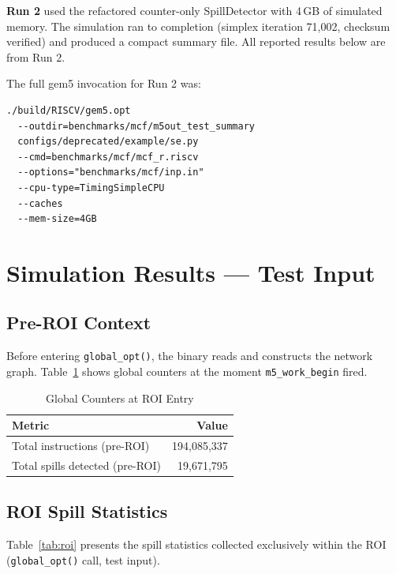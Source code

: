 \documentclass[conference]{IEEEtran}
\begin{document}
\textbf{Run 2} used the refactored counter-only SpillDetector with
4\,GB of simulated memory. The simulation ran to completion (simplex
iteration 71,002, checksum verified) and produced a compact summary file.
All reported results below are from Run 2.

The full gem5 invocation for Run 2 was:

\begin{verbatim}
./build/RISCV/gem5.opt
  --outdir=benchmarks/mcf/m5out_test_summary
  configs/deprecated/example/se.py
  --cmd=benchmarks/mcf/mcf_r.riscv
  --options="benchmarks/mcf/inp.in"
  --cpu-type=TimingSimpleCPU
  --caches
  --mem-size=4GB
\end{verbatim}

\section{Simulation Results — Test Input}

\subsection{Pre-ROI Context}

Before entering \texttt{global\_opt()}, the binary reads and constructs
the network graph. Table~\ref{tab:preroi} shows global counters at the
moment \texttt{m5\_work\_begin} fired.

\begin{table}[H]
\centering
\caption{Global Counters at ROI Entry}
\label{tab:preroi}
\begin{tabular}{lr}
\toprule
\textbf{Metric} & \textbf{Value} \\
\midrule
Total instructions (pre-ROI) & 194,085,337 \\
Total spills detected (pre-ROI) & 19,671,795 \\
\bottomrule
\end{tabular}
\end{table}

\subsection{ROI Spill Statistics}

Table~\ref{tab:roi} presents the spill statistics collected exclusively
within the ROI (\texttt{global\_opt()} call, test input).
\end{document}
